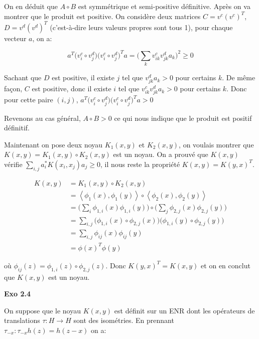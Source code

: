 \documentclass[11pt]{article}
\begin{document}
    On en déduit que $A \circ B$ est symmétrique et semi-positive définitive. Après on va montrer que le produit est positive. On considère deux matrices $C = v^c (v^c)^T$, $D = v^d (v^d)^T$ (c'est-à-dire leurs valeurs propres sont tous 1), pour chaque vecteur $a$, on a:

    \vspace{-2.5em}
    $$a^T \Big (v_i^c \circ v_j^d \Big ) \Big (v_i^c \circ v_j^d \Big )^T a = \Big (\sum_k v_{ik}^c v_{jk}^d a_k \Big )^2 \ge 0$$
    \vspace{-2.5em}

    Sachant que $D$ est positive, il existe $j$ tel que $v_{jk}^d a_k > 0$ pour certains $k$. De même façon, $C$ est positive, donc il existe $i$ tel que $v_{ik}^c v_{jk}^d a_k > 0$ pour certains $k$. Donc pour cette paire $(i, j)$, $a^T \Big (v_i^c \circ v_j^d \Big ) \Big (v_i^c \circ v_j^d \Big )^T a > 0$

    Revenons au cas général, $A \circ B > 0$ ce qui nous indique que le produit est positif définitif.

    Maintenant on pose deux noyau $K_1 (x, y)$ et $K_2 (x, y)$, on voulais montrer que $K(x, y) = K_1 (x,y) \circ K_2 (x, y)$ est un noyau. On a prouvé que $K(x,y)$ vérifie $\sum_{i,j} a_i^* K(x_i, x_j) a_j \ge 0$, il nous reste la propriété $K(x,y) = K(y,x)^T$.

    \vspace{-4em}
    \begin{align*}
      K(x, y) &= K_1 (x, y) \circ K_2 (x, y) \\
      &= \left \langle \phi_1(x), \phi_1(y) \right \rangle \circ \left \langle \phi_2(x), \phi_2(y) \right \rangle  \\
      &= \Big ( \sum_{i} \phi_{1, i}(x)\phi_{1, i}(y)  \Big ) \circ \Big ( \sum_{j} \phi_{2, j}(x) \phi_{2, j}(y)  \Big ) \\
      &= \sum_{i,j} \Big( \phi_{1, i}(x) \circ \phi_{2, j}(x) \Big) \Big( \phi_{1, i}(y) \circ \phi_{2, j}(y) \Big) \\
      &= \sum_{i,j} \phi_{ij} (x) \phi_{ij} (y) \\
      &= \phi(x)^T \phi(y)
    \end{align*}
    \vspace{-5em}

    où $\phi_{ij}(z) = \phi_{1, i}(z) \circ \phi_{2, j}(z)$. Donc $K(y, x)^T = K(x,y)$ et on en conclut que $K(x, y)$ est un noyau.

    \textbf{Exo 2.4}

    On suppose que le noyau $K(x,y)$ est définit sur un ENR dont les opérateurs de translations $\tau: H \to H$ sont des isométries. En prennant $\tau_{-x}: \tau_{-x} h(z) = h(z-x)$ on a:
\end{document}
